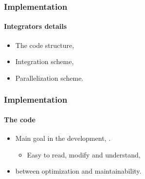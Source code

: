 \begin{frame}
    \frametitle{Implementation}
    \framesubtitle{Integrators details}

            \begin{itemize}
                \item The code structure,
                \item Integration scheme,
                \item Parallelization scheme.
            \end{itemize}



\end{frame}

%

\begin{frame}
    \frametitle{Implementation}
    \framesubtitle{The code}

    \begin{itemize}
        \item Main goal in the development, .
        \begin{itemize}
            \item Easy to read, modify and understand,
        \end{itemize}
        \item {} between optimization and maintainability.
    \end{itemize}


\end{frame}


